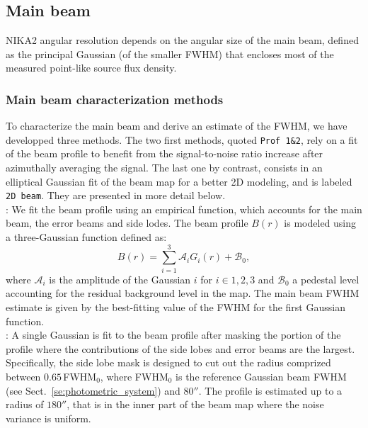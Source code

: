 \subsection{Main beam}
\label{se:mainbeam}

NIKA2 angular resolution depends on the angular size of the main beam,
defined as the principal Gaussian (of the smaller FWHM) that encloses
most of the measured point-like source flux density.

\subsubsection{Main beam characterization methods}
\label{se:mainbeam_methods}
To characterize the main beam and derive an estimate of the FWHM, we
have developped three methods. The two first methods, quoted
{\tt Prof 1\&2}, rely on a fit of the beam profile to benefit from the
signal-to-noise ratio increase after azimuthally averaging the
signal. The last one by contrast,
consists in an elliptical Gaussian fit of the beam map for a better
2D modeling, and is labeled {\tt 2D beam}. They are presented in more
detail below. \\

: We fit the beam profile using an empirical function,
which accounts for the main beam, the error beams and side
lodes.%
The beam profile $B(r)$ is modeled using a three-Gaussian function defined as:
\begin{equation}
  B(r) = \sum_{i=1}^{3} \mathcal{A}_i G_i(r) + \mathcal{B}_0,
  \label{eq:3gauss}
\end{equation}
where $\mathcal{A}_i$ is the amplitude of the Gaussian $i$ for $i \in {1, 2, 3}$ and
$\mathcal{B}_0$ a pedestal level accounting for the residual background
level in the map. The main beam FWHM estimate is given by the best-fitting value
of the FWHM for the first Gaussian function.\\

: A single Gaussian is fit to the beam profile after
masking the portion of the profile where the contributions of the side
lobes and error beams are the largest. Specifically, the side lobe mask
is designed to cut out the radius comprized between $0.65\, $FWHM$_0$,
where FWHM$_0$ is the reference Gaussian beam FWHM (see
Sect.~\ref{se:photometric_system}) and $80''$. %
The profile is estimated up to a radius of
$180''$, that is in the inner part of the beam map where the noise
variance is uniform.\\

